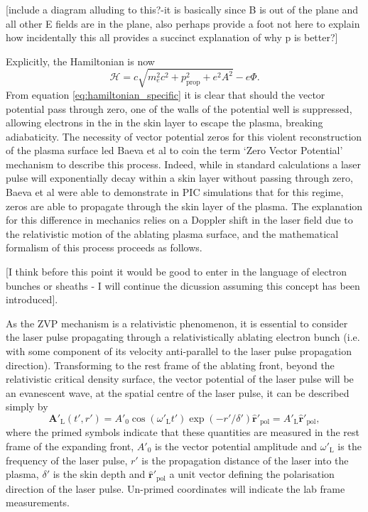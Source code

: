 [include a diagram alluding to this?-it is basically since B is out of the plane and all other E fields are in the plane, also perhaps provide a foot not here to explain how incidentally this all provides a succinct explanation of why p is better?]

Explicitly, the Hamiltonian is now
\begin{equation}\label{eq:hamiltonian_specific}
	\mathcal{H} = c\sqrt{m^2_ec^2 + p^2_\mathrm{prop} + e^2A^2} - e\Phi.
\end{equation}
From equation \ref{eq:hamiltonian_specific} it is clear that should the vector potential pass through zero, one of the walls of the potential well is suppressed, allowing electrons in the in the skin layer to escape the plasma, breaking adiabaticity. The necessity of vector potential zeros for this violent reconstruction of the plasma surface led Baeva et al \cite{baevaZeroVectorPotential2011} to coin the term `Zero Vector Potential' mechanism to describe this process. Indeed, while in standard calculations a laser pulse will exponentially decay within a skin layer without passing through zero, Baeva et al \cite{baevaZeroVectorPotential2011} were able to demonstrate in \ac{PIC} simulations that for this regime, zeros are able to propagate through the skin layer of the plasma. The explanation for this difference in mechanics relies on a Doppler shift in the laser field due to the relativistic motion of the ablating plasma surface, and the mathematical formalism of this process proceeds as follows.

[I think before this point it would be good to enter in the language of electron bunches or sheaths - I will continue the dicussion assuming this concept has been introduced].

As the \ac{ZVP} mechanism is a relativistic phenomenon, it is essential to consider the laser pulse propagating through a relativistically ablating electron bunch (i.e. with some component of its velocity anti-parallel to the laser pulse propagation direction). Transforming to the rest frame of the ablating front, beyond the relativistic critical density surface, the vector potential of the laser pulse will be an evanescent wave, at the spatial centre of the laser pulse, it can be described simply by
\begin{equation}
	\mathbf{A}'_\mathrm{L}(t',r') = A'_0\cos(\omega'_\mathrm{L}t')\exp(-r'/\delta')\hat{\mathbf{r}}'_\mathrm{pol}= A'_\mathrm{L}\hat{\mathbf{r}}'_\mathrm{pol},
\end{equation}
where the primed symbols indicate that these quantities are measured in the rest frame of the expanding front, $A'_0$ is the vector potential amplitude and $\omega'_\mathrm{L}$ is the frequency of the laser pulse, $r'$ is the propagation distance of the laser into the plasma, $\delta'$ is the skin depth and $\hat{\mathbf{r}}'_\mathrm{pol}$ a unit vector defining the polarisation direction of the laser pulse. Un-primed coordinates will indicate the lab frame measurements.

